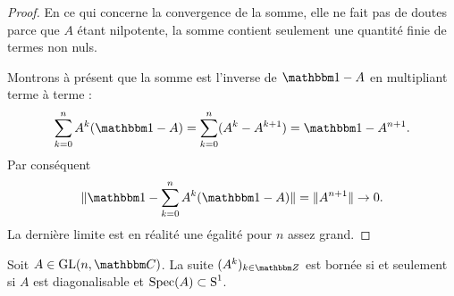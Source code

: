 \begin{proof}
    En ce qui concerne la convergence de la somme, elle ne fait pas de doutes parce que \( A\) étant nilpotente, la somme contient seulement une quantité finie de termes non nuls.

    Montrons à présent que la somme est l'inverse de \( \mtu-A\) en multipliant terme à terme :
    \begin{equation}
        \sum_{k=0}^nA^k(\mtu-A)=\sum_{k=0}^n(A^k-A^{k+1})=\mtu-A^{n+1}.
    \end{equation}
    Par conséquent
    \begin{equation}
        \| \mtu-\sum_{k=0}^nA^k(\mtu-A) \|=\| A^{n+1} \|\to 0.
    \end{equation}
    La dernière limite est en réalité une égalité pour \( n\) assez grand.
\end{proof}

\begin{proposition}
    Soit \( A\in\GL(n,\eC)\). La suite \( (A^k)_{k\in \eZ}\) est bornée si et seulement si \( A\) est diagonalisable et \( \operatorname{Spec}(A)\subset \operatorname{S}^1\).
\end{proposition}


